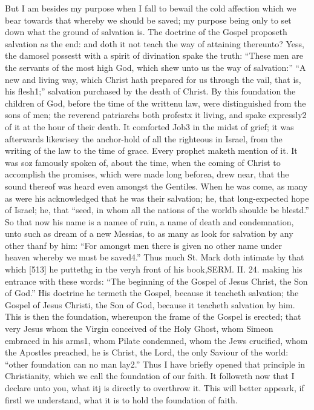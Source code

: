 But I am besides my purpose when I fall to bewail the cold affection which we bear towards that whereby we should be saved; my purpose being only to set down what the ground of salvation is. The doctrine of the Gospel proposeth salvation as the end: and doth it not teach the way of attaining thereunto? Yess, the damosel possestt with a spirit of divination spake the truth: “These men are the servants of the most high God, which shew unto us the way of salvation:” “A new and living way, which Christ hath prepared for us through the vail, that is, his flesh1;” salvation purchased by the death of Christ. By this foundation the children of God, before the time of the writtenu law, were distinguished from the sons of men; the reverend patriarchs both profestx it living, and spake expressly2 of it at the hour of their death. It comforted Job3 in the midst of grief; it was afterwards likewisey the anchor-hold of all the righteous in Israel, from the writing of the law to the time of grace. Every prophet maketh mention of it. It was soz famously spoken of, about the time, when the coming of Christ to accomplish the promises, which were made long beforea, drew near, that the sound thereof was heard even amongst the Gentiles. When he was come, as many as were his acknowledged that he was their salvation; he, that long-expected hope of Israel; he, that “seed, in whom all the nations of the worldb shouldc be blestd.” So that now his name is a namee of ruin, a name of death and condemnation, unto such as dream of a new Messias, to as many as look for salvation by any other thanf by him: “For amongst men there is given no other name under heaven whereby we must be saved4.” Thus much St. Mark doth intimate by that which [513] he puttethg in the veryh front of his book,SERM. II. 24. making his entrance with these words: “The beginning of the Gospel of Jesus Christ, the Son of God.” His doctrine he termeth the Gospel, because it teacheth salvation; the Gospel of Jesus Christi, the Son of God, because it teacheth salvation by him. This is then the foundation, whereupon the frame of the Gospel is erected; that very Jesus whom the Virgin conceived of the Holy Ghost, whom Simeon embraced in his arms1, whom Pilate condemned, whom the Jews crucified, whom the Apostles preached, he is Christ, the Lord, the only Saviour of the world: “other foundation can no man lay2.” Thus I have briefly opened that principle in Christianity, which we call the foundation of our faith. It followeth now that I declare unto you, what itj is directly to overthrow it. This will better appeark, if firstl we understand, what it is to hold the foundation of faith.

